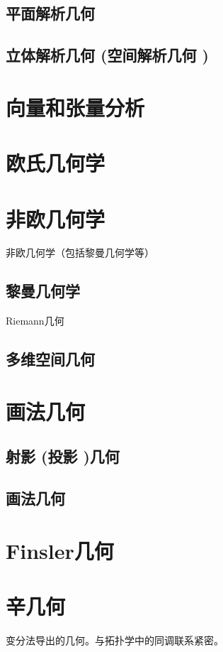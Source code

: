 \documentclass[UTF8]{../09-Mathematics}
\begin{document}
    \section{平面解析几何}
    \section{立体解析几何 (空间解析几何 )}


\chapter{向量和张量分析}


\chapter{欧氏几何学}



\chapter{非欧几何学}
非欧几何学（包括黎曼几何学等）
    \section{黎曼几何学}
    Riemann几何
    \section{多维空间几何}


\chapter{画法几何}
    \section{射影 (投影 )几何}
    \section{画法几何}



\chapter{Finsler几何}

\chapter{辛几何}
变分法导出的几何。与拓扑学中的同调联系紧密。
\end{document}
